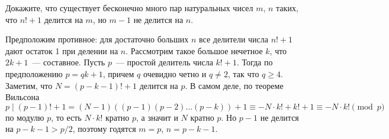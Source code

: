 Докажите, что существует бесконечно много пар натуральных чисел $m$, $n$ таких,
что $n! + 1$ делится на $m$, но $m - 1$ не делится на $n$.

\solution
Предположим противное: для достаточно больших $n$ все делители числа $n! + 1$
дают остаток 1 при делении на $n$.
Рассмотрим такое большое нечетное $k$, что $2 k + 1$~--- составное.
Пусть $p$~--- простой делитель числа $k! + 1$.
Тогда по предположению $p = q k + 1$, причем $q$ очевидно четно и $q \neq 2$,
так что $q \geq 4$.
Заметим, что $N = (p - k - 1)! + 1$ делится на $p$.
В самом деле, по теореме Вильсона
\[
    p
\mid
    (p - 1)! + 1
=
    (N - 1) ((p - 1) (p - 2) \ldots (p - k)) + 1
\equiv
    -N \cdot k! + k! + 1
\equiv
    -N \cdot k!
\pmod{p}
\]
по модулю $p$, то есть $N \cdot k!$ кратно $p$,
а значит и $N$ кратно $p$.
Но $p - 1$ не делится на $p - k - 1 > p / 2$, поэтому годятся
$m = p$, $n = p - k - 1$.

